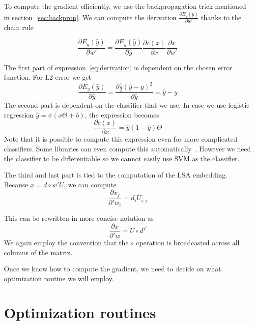     To compute the gradient efficiently, we use the backpropagation trick mentioned in section~\ref{sec:backprop}.
    We can compute the derivation $\frac{\partial E_y(\hat{y})}{\partial w'}$ thanks to the chain rule
    
    \begin{equation} \label{eq:derivation}
    \frac{\partial E_y(\hat{y})}{\partial w'} = \frac{\partial E_y(\hat{y})}{\partial \hat{y}} \frac{\partial c(x)}{\partial x} \frac{\partial x}{\partial w'}
    \end{equation}
    
    The first part of expression~\ref{eq:derivation} is dependent on the chosen error function. 
    For L2 error we get 
    \begin{equation}
    \frac{\partial E_y(\hat{y})}{\partial \hat{y}} = \frac{\partial \frac{1}{2}(\hat{y}-y)^2}{\partial \hat{y}} = \hat{y}-y
    \end{equation}
    The second part is dependent on the classifier that we use. 
    In case we use logistic regression $\hat{y} = \sigma(x \Theta + b)$, the expression becomes
    \begin{equation}
    \frac{\partial c(x)}{\partial x} = \hat{y} (1-\hat{y}) \Theta
    \end{equation}
    Note that it is possible to compute this expression even for more complicated classifiers. 
    Some libraries can even compute this automatically~\cite{tensorflow2015-whitepaper}.
    However we need the classifier to be differentiable so we cannot easily use SVM as the classifier. 
    
    The third and last part is tied to the computation of the LSA embedding.
    Because $x = d \circ w' U$, we can compute 
    \begin{equation}
    \frac{\partial x_j}{\partial 'w_i} = d_i U_{i,j}
    \end{equation}
    
    This can be rewritten in more concise notation as 
    \begin{equation}
        \frac{\partial x}{\partial 'w} = U \circ d^T
    \end{equation}
    We again employ the convention that the $\circ$ operation is broadcasted across all columns of the matrix.

    Once we know how to compute the gradient, we need to decide on what optimization routine we will employ.

\section{Optimization routines}
    
